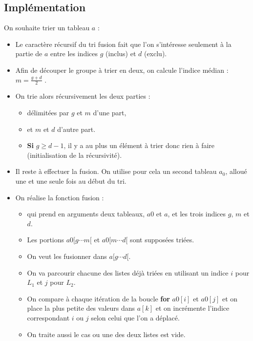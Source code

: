 \subsection{Implémentation}


On souhaite trier un tableau $a$ :
\begin{itemize}
\item Le caractère récursif du tri fusion fait que l'on s'intéresse seulement à la partie de $a$ entre les indices $g$ (inclus) et $d$ (exclu).
\item Afin de découper le groupe à trier en deux, on calcule l'indice médian :
$m = \frac{g+d}{2}$ . 

\item On trie alors récursivement les deux parties :
\begin{itemize}
\item délimitées par $g$ et $m$ d'une part,
\item et $m$ et $d$ d'autre part.
\item \textbf{Si} \textbf{$g\geq d-1$}, il y a au plus un élément à trier donc rien à faire (initialisation de la récursivité).
\end{itemize}


%		


\item Il reste à effectuer la fusion. On utilise pour cela un second tableau $a_0$, alloué une et une seule fois au
début du tri.
\item On réalise la fonction fusion :
\begin{itemize}
\item qui prend en arguments deux tableaux, $a0$ et $a$, et les trois indices $g$, $m$ et $d$. 
\item Les portions $a0[g \cdots  m[$ et $a0[m \cdots d[$ sont supposées triées.
\item On veut les fusionner dans $a[g\cdots d[$. 
\item On va parcourir chacune des listes déjà triées en utilisant un indice $i$ pour $L_1$ et $j$ pour $L_2$.
\item On compare à chaque itération de la boucle \textbf{for} $a0[i]$ et $a0[j]$ et on place la plus petite des valeurs dans $a[k]$ et on incrémente l'indice correspondant $i$ ou $j$ selon celui que l'on a déplacé.
\item On traite aussi le cas ou une des deux listes est vide.
\end{itemize}


%		


\end{itemize}
%


